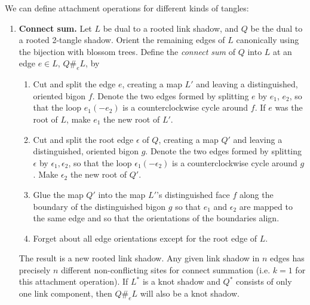 \documentclass[amsmath,longbibliography,secnumarabic,floatfix,amssymb,nofootinbib,nobibnotes,letterpaper,11pt,notitlepage,preprint]{revtex4-1}
\begin{document}
We can define attachment operations for different kinds of tangles:
\begin{enumerate}
\item \textbf{Connect sum.} Let $L$ be dual to a rooted link shadow, and $Q$ be the dual to a rooted
  2-tangle shadow. Orient the remaining edges of $L$ canonically using the bijection with blossom
  trees. Define the \emph{connect sum} of $Q$ into $L$ at an edge $e \in L$, $Q \#_e L$, by
  \begin{enumerate}
  \item Cut and split the edge $e$, creating a map $L'$ and leaving a distinguished, oriented bigon
    $f$. Denote the two edges formed by splitting $e$ by $e_1$, $e_2$, so that the loop $e_1(-e_2)$
    is a counterclockwise cycle around $f$. If $e$ was the root of $L$, make $e_1$ the new root of
    $L'$.
  \item Cut and split the root edge $\epsilon$ of $Q$, creating a map $Q'$ and leaving a
    distinguished, oriented bigon $g$. Denote the two edges formed by splitting $\epsilon$ by
    $\epsilon_1, \epsilon_2$, so that the loop $\epsilon_1(-\epsilon_2)$ is a counterclockwise cycle
    around $g$. Make $\epsilon_2$ the new root of $Q'$.
  \item Glue the map $Q'$ into the map $L'$'s distinguished face $f$ along the boundary of the
    distinguished bigon $g$ so that $e_1$ and $\epsilon_2$ are mapped to the same edge and so that
    the orientations of the boundaries align.
  \item Forget about all edge orientations except for the root edge of $L$.
  \end{enumerate} The result is a new rooted link shadow. Any given link shadow in $n$ edges has
  precisely $n$ different non-conflicting sites for connect summation (i.e. $k = 1$ for this
  attachment operation). If $L^*$ is a knot shadow and $Q^*$ consists of only one link component,
  then $Q \#_e L$ will also be a knot shadow.
  \begin{figure}[h!]  \centering
\end{figure}
\end{enumerate}
\end{document}
